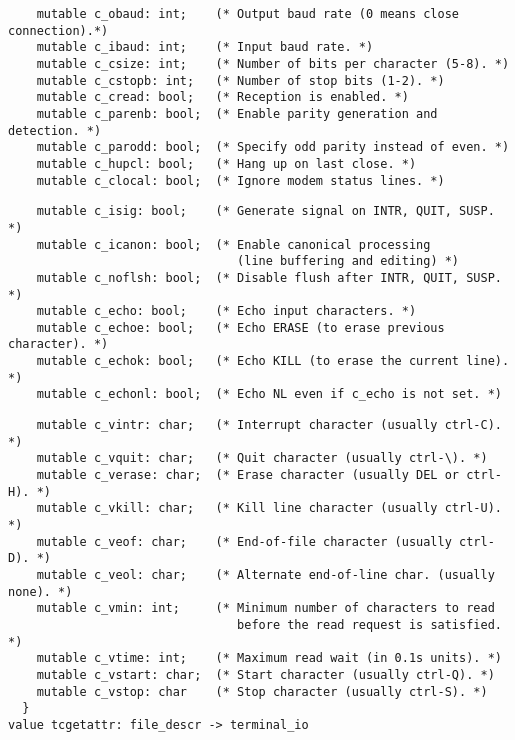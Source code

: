 \begin{comment}
 Control modes: 
\end{comment}
\begin{verbatim}
    mutable c_obaud: int;    (* Output baud rate (0 means close connection).*)
    mutable c_ibaud: int;    (* Input baud rate. *)
    mutable c_csize: int;    (* Number of bits per character (5-8). *)
    mutable c_cstopb: int;   (* Number of stop bits (1-2). *)
    mutable c_cread: bool;   (* Reception is enabled. *)
    mutable c_parenb: bool;  (* Enable parity generation and detection. *)
    mutable c_parodd: bool;  (* Specify odd parity instead of even. *)
    mutable c_hupcl: bool;   (* Hang up on last close. *)
    mutable c_clocal: bool;  (* Ignore modem status lines. *)
\end{verbatim}
\begin{comment}
 Local modes: 
\end{comment}
\begin{verbatim}
    mutable c_isig: bool;    (* Generate signal on INTR, QUIT, SUSP. *)
    mutable c_icanon: bool;  (* Enable canonical processing
                                (line buffering and editing) *)
    mutable c_noflsh: bool;  (* Disable flush after INTR, QUIT, SUSP. *)
    mutable c_echo: bool;    (* Echo input characters. *)
    mutable c_echoe: bool;   (* Echo ERASE (to erase previous character). *)
    mutable c_echok: bool;   (* Echo KILL (to erase the current line). *)
    mutable c_echonl: bool;  (* Echo NL even if c_echo is not set. *)
\end{verbatim}
\begin{comment}
 Control characters: 
\end{comment}
\begin{verbatim}
    mutable c_vintr: char;   (* Interrupt character (usually ctrl-C). *)
    mutable c_vquit: char;   (* Quit character (usually ctrl-\). *)
    mutable c_verase: char;  (* Erase character (usually DEL or ctrl-H). *)
    mutable c_vkill: char;   (* Kill line character (usually ctrl-U). *)
    mutable c_veof: char;    (* End-of-file character (usually ctrl-D). *)
    mutable c_veol: char;    (* Alternate end-of-line char. (usually none). *)
    mutable c_vmin: int;     (* Minimum number of characters to read
                                before the read request is satisfied. *)
    mutable c_vtime: int;    (* Maximum read wait (in 0.1s units). *)
    mutable c_vstart: char;  (* Start character (usually ctrl-Q). *)
    mutable c_vstop: char    (* Stop character (usually ctrl-S). *)
  }
value tcgetattr: file_descr -> terminal_io
\end{verbatim}
